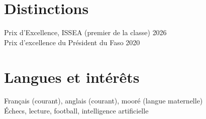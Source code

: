 \documentclass[10pt,a4paper]{article}
\begin{document}
\vspace{2pt}
\begin{minipage}[t]{0.52\textwidth}
\section{Distinctions}
Prix d'Excellence, ISSEA (premier de la classe) \hfill {\small\color{muted}2026}\\
Prix d'excellence du Pr\'esident du Faso \hfill {\small\color{muted}2020}
\end{minipage}\hfill
\begin{minipage}[t]{0.42\textwidth}
\section{Langues et int\'er\^ets}
Fran\c{c}ais (courant), anglais (courant), moor\'e (langue maternelle)\\
\'Echecs, lecture, football, intelligence artificielle
\end{minipage}
\end{document}
